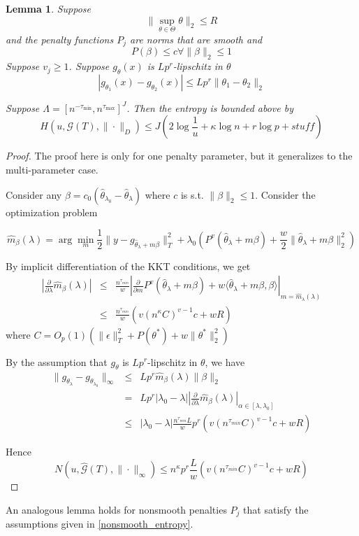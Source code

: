 \documentclass[12pt]{article}
\newtheorem{lemma}{Lemma}
\begin{document}
\begin{lemma}
Suppose 
\[
\|\sup_{\theta\in\Theta}\theta\|_{2}\le R
\]
and the penalty functions $P_j$ are norms that are smooth and
\[
P(\beta)\le c\forall\|\beta\|_{2}\le1
\]
Suppose $v_j \ge 1$.
Suppose $g_{\theta}(x)$ is $Lp^r$-lipschitz in $\theta$
\[
\left|g_{\theta_{1}}(x)-g_{\theta_{2}}(x)\right|\le Lp^r \|\theta_{1}-\theta_{2}\|_2
\]


Suppose $\Lambda = [n^{- \tau_{\min}} , n^{\tau_{\max}}]^J$. 
Then the entropy is bounded above by
\begin{equation}
H \left ( u, \mathcal{G}(T), \| \cdot \|_D \right ) \le J \left ( 2 \log \frac{1}{u} + \kappa \log n + r \log p + stuff \right )
\end{equation}
\end{lemma}

\begin{proof}
The proof here is only for one penalty parameter, but it generalizes to the multi-parameter case.

Consider any $\beta=c_{0}\left(\hat{\theta}_{\lambda_{0}}-\hat{\theta}_{\lambda}\right)$
where $c$ is s.t. $\|\beta\|_{2}\le1$. Consider the optimization
problem

\[
\hat{m}_{\beta}(\lambda)=\arg\min_{m}\frac{1}{2}\|y-g_{\hat{\theta}_{\lambda}+m\beta}\|_{T}^{2}+\lambda_{0}\left(P^{v}(\hat{\theta}_{\lambda}+m\beta)+\frac{w}{2}\|\hat{\theta}_{\lambda}+m\beta\|_{2}^{2}\right)
\]


By implicit differentiation of the KKT conditions, we get
\begin{eqnarray*}
\left|\frac{\partial}{\partial\lambda}\hat{m}_{\beta}(\lambda)\right|
 & \le & \frac{n^{\tau_{min}}}{w}\left|\frac{\partial}{\partial m}P^{v}(\hat{\theta}_{\lambda}+m\beta)+w\langle\hat{\theta}_{\lambda}+m\beta,\beta\rangle\right|_{m=\hat{m}_{\lambda}(\lambda)}\\
  & \le & \frac{n^{\tau_{min}}}{w}\left(v\left(n^{\kappa}C\right)^{v-1}c+wR\right)
\end{eqnarray*}
where $C = O_p(1) \left (\|\epsilon \|_{T}^{2}+ P(\theta^{*})+w \|\theta^{*}\|_{2}^{2} \right )$

By the assumption that $g_{\theta}$ is $Lp^r$-lipschitz in $\theta$, we have 
\begin{eqnarray*}
\|g_{\theta_{\lambda}}-g_{\theta_{\lambda_{0}}}\|_{\infty} 
& \le & Lp^{r}\hat{m}_{\beta}(\lambda)\|\beta\|_{2}\\
 & = & Lp^{r}|\lambda_{0}-\lambda|\left|\frac{\partial}{\partial\lambda}\hat{m}_{\beta}(\lambda)\right|_{\alpha \in [\lambda, \lambda_0]}\\
 & \le & |\lambda_0 - \lambda|\frac{n^{\tau_{min}}L}{w}p^{r}\left(v\left(n^{\tau_{min}}C\right)^{v-1}c+wR\right)
\end{eqnarray*}


Hence
\[
N\left(u,\hat{\mathcal{G}}(T),\|\cdot\|_{\infty}\right)\le n^{\kappa}p^{r}\frac{L}{w}\left(v\left(n^{\tau_{min}}C\right)^{v-1}c+wR\right)
\]

\end{proof}
An analogous lemma holds for nonsmooth penalties $P_j$ that satisfy the assumptions given in \ref{nonsmooth_entropy}.
\end{document}
